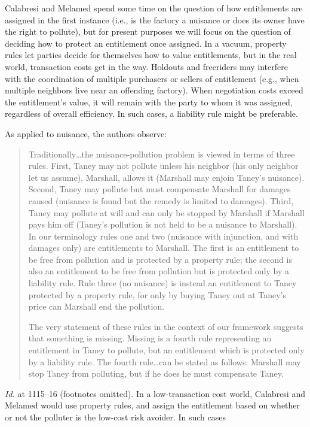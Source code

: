Calabresi and Melamed spend some time on the question of how entitlements are
assigned in the first instance (i.e., is the factory a nuisance or does its
owner have the right to pollute), but for present purposes we will focus on the
question of deciding how to protect an entitlement once assigned. In a vacuum,
property rules let parties decide for themselves how to value entitlements, but
in the real world, transaction costs get in the way. Holdouts and freeriders may
interfere with the coordination of multiple purchasers or sellers of entitlement
(e.g., when multiple neighbors live near an offending factory). When negotiation
costs exceed the entitlement's value, it will remain with the party to whom it
was assigned, regardless of overall efficiency. In such cases, a liability rule
might be preferable. 

As applied to nuisance, the authors observe:
\begin{quotation}
Traditionally\ldots the nuisance-pollution problem is viewed in terms of three
rules. First, Taney may not pollute unless his neighbor (his only neighbor let
us assume), Marshall, allows it (Marshall may enjoin Taney's nuisance). Second,
Taney may pollute but must compensate Marshall for damages caused (nuisance is
found but the remedy is limited to damages). Third, Taney may pollute at will
and can only be stopped by Marshall if Marshall pays him off (Taney's pollution
is not held to be a nuisance to Marshall). In our terminology rules one and two
(nuisance with injunction, and with damages only) are entitlements to Marshall.
The first is an entitlement to be free from pollution and is protected by a
property rule; the second is also an entitlement to be free from pollution but
is protected only by a liability rule. Rule three (no nuisance) is instead an
entitlement to Taney protected by a property rule, for only by buying Taney out
at Taney's price can Marshall end the pollution.

The very statement of these rules in the context of our framework suggests that
something is missing. Missing is a fourth rule representing an entitlement in
Taney to pollute, but an entitlement which is protected only by a liability
rule. The fourth rule\ldots can be stated as follows: Marshall may stop Taney
from polluting, but if he does he must compensate Taney.
\end{quotation}
\textit{Id.} at 1115--16 (footnotes omitted). In a low-transaction cost world,
Calabresi and Melamed would use property rules, and assign the entitlement based
on whether or not the polluter is the low-cost risk avoider. In such cases
